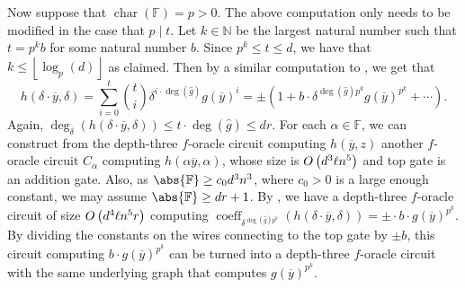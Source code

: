 \documentclass[10pt,a4paper]{amsart}
\DeclareMathOperator{\characteristic}{char}
\DeclareMathOperator{\coeff}{coeff}
\newcommand*\N{\mathbb{N}}
\newcommand*\F{\mathbb{F}}
\newcommand*\floor[1]{%
    \left\lfloor #1 \right\rfloor
}
\newcommand*\bigO[1]{%
    O\kern-0.0pt\left(#1\right)
}
\begin{document}
\begin{pf}
    Now suppose that $\characteristic(\F) = p > 0$.
    The above computation only needs to be modified in the case that $p \mid t$.
    Let $k \in \N$ be the largest natural number such that $t = p^k b$ for some natural number $b$.
    Since $p^k \leq t \leq d$, we have that $k \leq \floor{\log_p(d)}$ as claimed.
    Then by a similar computation to , we get that
    \begin{equation}\label{eq:pfaff_computation_char_p}
        h(\delta \cdot \overline{y}, \delta) = \sum_{i = 0}^t \binom{t}{i} \delta^{i \cdot \deg(\widehat{g})} g(\overline{y})^i = \pm(1 + b \cdot \delta^{\deg(\widehat{g}) p^k} g(\overline{y})^{p^k} + \cdots).
    \end{equation}
    Again, $\deg_\delta(h(\delta \cdot \overline{y}, \delta)) \leq t \cdot \deg(\widehat{g}) \leq dr$.
    For each $\alpha\in\F$, we can construct from the depth-three $f$-oracle circuit computing $h(\overline{y},z)$ another $f$-oracle circuit $C_\alpha$ computing $h(\alpha \overline{y}, \alpha)$, whose size is $\bigO{d^3 \ell n^5}$ and top gate is an addition gate.
    Also, as $\abs{\F} \geq c_0 d^3 n^3$, where $c_0>0$ is a large enough constant, we may assume $\abs{\F} \geq dr+1$.
    By , we have a depth-three $f$-oracle circuit of size $\bigO{d^4 \ell n^5 r}$ computing $\coeff_{\delta^{\deg(\widehat{g})p^k}}(h(\delta\cdot \overline{y},\delta))= \pm \cdot b \cdot g(\overline{y})^{p^k}$.
    By dividing the constants on the wires connecting to the top gate by $\pm b$, this circuit computing $b\cdot g(\overline{y})^{p^k}$ can be turned into a depth-three $f$-oracle circuit with the same underlying graph that computes $g(\overline{y})^{p^k}$.
\end{pf}
\end{document}
